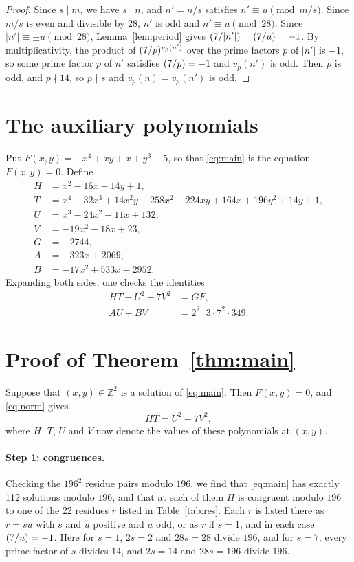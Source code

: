 \documentclass[11pt]{article}
\newcommand{\Z}{\mathbb{Z}}
\newcommand{\leg}[2]{\mathchoice{\biggl(\dfrac{#1}{#2}\biggr)}{(#1/#2)}{(#1/#2)}{(#1/#2)}}
\begin{document}
\begin{proof}
Since $s\mid m$, we have $s\mid n$, and $n'=n/s$ satisfies $n'\equiv u\pmod{m/s}$. Since $m/s$ is even and divisible by $28$, $n'$ is odd and $n'\equiv u\pmod{28}$. Since $|n'|\equiv\pm u\pmod{28}$, Lemma~\ref{lem:period} gives $\leg{7}{|n'|}=\leg{7}{u}=-1$. By multiplicativity, the product of $\leg{7}{p}^{v_p(n')}$ over the prime factors $p$ of $|n'|$ is $-1$, so some prime factor $p$ of $n'$ satisfies $\leg{7}{p}=-1$ and $v_p(n')$ is odd. Then $p$ is odd, and $p\nmid14$, so $p\nmid s$ and $v_p(n)=v_p(n')$ is odd.
\end{proof}

\section{The auxiliary polynomials}

Put $F(x,y)=-x^{4}+xy+x+y^{3}+5$, so that \eqref{eq:main} is the equation $F(x,y)=0$. Define
\begin{align*}
H&=x^{2}-16x-14y+1,\\
T&=x^{4}-32x^{3}+14x^{2}y+258x^{2}-224xy+164x+196y^{2}+14y+1,\\
U&=x^{3}-24x^{2}-11x+132,\\
V&=-19x^{2}-18x+23,\\
G&=-2744,\\
A&=-323x+2069,\\
B&=-17x^{2}+533x-2952.
\end{align*}
Expanding both sides, one checks the identities
\begin{align}
HT-U^2+7V^2&=GF,\label{eq:norm}\\
AU+BV&=2^{2}\cdot 3\cdot 7^{2}\cdot 349.\label{eq:bezout}
\end{align}

\section{Proof of Theorem~\ref{thm:main}}

Suppose that $(x,y)\in\Z^2$ is a solution of \eqref{eq:main}. Then $F(x,y)=0$, and \eqref{eq:norm} gives
\begin{equation}\label{eq:HT}
HT=U^2-7V^2,
\end{equation}
where $H$, $T$, $U$ and $V$ now denote the values of these polynomials at $(x,y)$.

\paragraph{Step 1: congruences.} Checking the $196^2$ residue pairs modulo $196$, we find that \eqref{eq:main} has exactly 112 solutions modulo $196$, and that at each of them $H$ is congruent modulo $196$ to one of the 22 residues $r$ listed in Table~\ref{tab:res}. Each $r$ is listed there as $r=su$ with $s$ and $u$ positive and $u$ odd, or as $r$ if $s=1$, and in each case $\leg{7}{u}=-1$. Here for $s=1$, $2s=2$ and $28s=28$ divide $196$, and for $s=7$, every prime factor of $s$ divides $14$, and $2s=14$ and $28s=196$ divide $196$.
\end{document}
